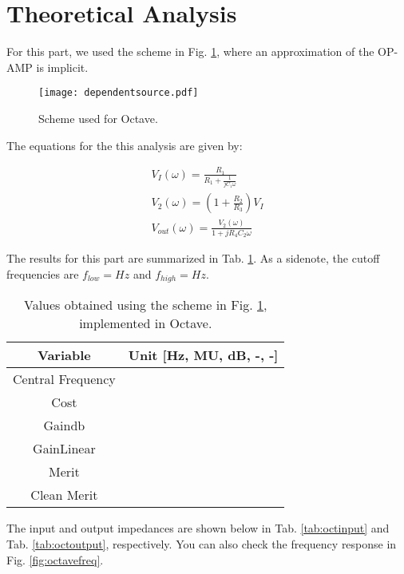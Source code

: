 \section{Theoretical Analysis}

For this part, we used the scheme in Fig. \ref{fig:joaoscheme}, where an approximation of the OP-AMP is implicit.

\begin{figure}[H]
    \centering
    \texttt{[image: dependentsource.pdf]}
    \caption{Scheme used for Octave.}
    \label{fig:joaoscheme}
\end{figure}

The equations for the this analysis are given by:

\begin{gather}
 V_I(\omega) = \frac{R_1}{R_1+\frac{1}{jC_1\omega}} \\
 V_2(\omega) = \left(1+\frac{R_2}{R_3} \right)V_I\\
 V_{out}(\omega) = \frac{V_2(\omega)}{1+jR_4C_2\omega}
\end{gather}

The results for this part are summarized in Tab. \ref{tab:valuesoctave}. As a sidenote, the cutoff frequencies are $f_{low} = Hz$ and $f_{high} = Hz$.

\begin{table}[H]
    \centering
    \begin{tabular}{|c|c|}
        \hline
        Variable & Unit [Hz, MU, dB, -, -]\\ 
        \hline
        Central Frequency & \\
        \hline
        Cost & \\
        \hline
        Gaindb & \\
        \hline
        GainLinear & \\
        \hline
        Merit & \\
        \hline
        Clean Merit & \\
        \hline
    \end{tabular}
    \caption{Values obtained using the scheme in Fig. \ref{fig:joaoscheme}, implemented in Octave.}
    \label{tab:valuesoctave}
\end{table}

The input and output impedances are shown below in Tab. \ref{tab:octinput} and Tab. \ref{tab:octoutput}, respectively. You can also check the frequency response in Fig. \ref{fig:octavefreq}.

